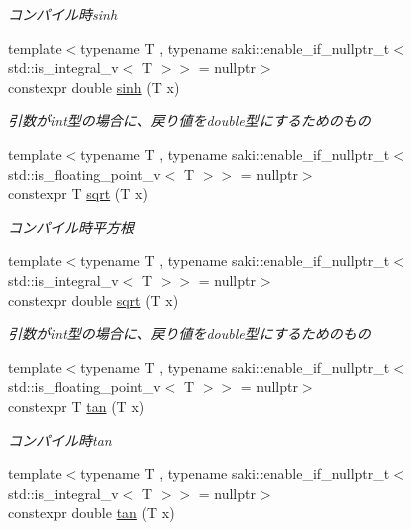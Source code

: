 \begin{DoxyCompactItemize}
\begin{DoxyCompactList}\small\item\em コンパイル時sinh \end{DoxyCompactList}\item 
{\footnotesize template$<$typename T , typename saki\+::enable\+\_\+if\+\_\+nullptr\+\_\+t$<$ std\+::is\+\_\+integral\+\_\+v$<$ T $>$$>$  = nullptr$>$ }\\constexpr double \mbox{\hyperlink{namespacesaki_a8199390b7650fdebe491aaeb4c3a44c3}{sinh}} (T x)
\begin{DoxyCompactList}\small\item\em 引数がint型の場合に、戻り値をdouble型にするためのもの \end{DoxyCompactList}\item 
{\footnotesize template$<$typename T , typename saki\+::enable\+\_\+if\+\_\+nullptr\+\_\+t$<$ std\+::is\+\_\+floating\+\_\+point\+\_\+v$<$ T $>$$>$  = nullptr$>$ }\\constexpr T \mbox{\hyperlink{namespacesaki_a5c2f6c98a144d6ba6683c86c865fd595}{sqrt}} (T x)
\begin{DoxyCompactList}\small\item\em コンパイル時平方根 \end{DoxyCompactList}\item 
{\footnotesize template$<$typename T , typename saki\+::enable\+\_\+if\+\_\+nullptr\+\_\+t$<$ std\+::is\+\_\+integral\+\_\+v$<$ T $>$$>$  = nullptr$>$ }\\constexpr double \mbox{\hyperlink{namespacesaki_a66fac13294984ad19b8b7fec3b5466b5}{sqrt}} (T x)
\begin{DoxyCompactList}\small\item\em 引数がint型の場合に、戻り値をdouble型にするためのもの \end{DoxyCompactList}\item 
{\footnotesize template$<$typename T , typename saki\+::enable\+\_\+if\+\_\+nullptr\+\_\+t$<$ std\+::is\+\_\+floating\+\_\+point\+\_\+v$<$ T $>$$>$  = nullptr$>$ }\\constexpr T \mbox{\hyperlink{namespacesaki_a491321db8475898649b625dca5401726}{tan}} (T x)
\begin{DoxyCompactList}\small\item\em コンパイル時tan \end{DoxyCompactList}\item 
{\footnotesize template$<$typename T , typename saki\+::enable\+\_\+if\+\_\+nullptr\+\_\+t$<$ std\+::is\+\_\+integral\+\_\+v$<$ T $>$$>$  = nullptr$>$ }\\constexpr double \mbox{\hyperlink{namespacesaki_a52704083849bbdf4ab635cca985c00ae}{tan}} (T x)

\end{DoxyCompactItemize}
